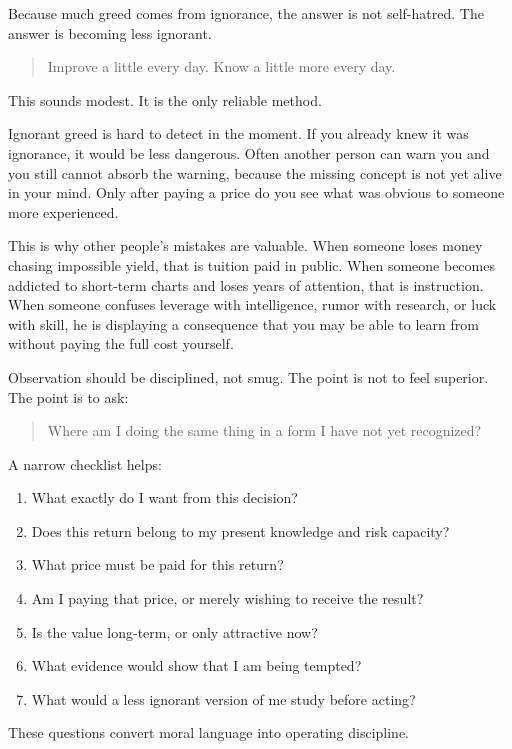 Because much greed comes from ignorance, the answer is not self-hatred. The answer is becoming less ignorant.

\begin{quote}
Improve a little every day. Know a little more every day.
\end{quote}

This sounds modest. It is the only reliable method.

Ignorant greed is hard to detect in the moment. If you already knew it was ignorance, it would be less dangerous. Often another person can warn you and you still cannot absorb the warning, because the missing concept is not yet alive in your mind. Only after paying a price do you see what was obvious to someone more experienced.

This is why other people's mistakes are valuable. When someone loses money chasing impossible yield, that is tuition paid in public. When someone becomes addicted to short-term charts and loses years of attention, that is instruction. When someone confuses leverage with intelligence, rumor with research, or luck with skill, he is displaying a consequence that you may be able to learn from without paying the full cost yourself.

Observation should be disciplined, not smug. The point is not to feel superior. The point is to ask:

\begin{quote}
Where am I doing the same thing in a form I have not yet recognized?
\end{quote}

A narrow checklist helps:

\begin{enumerate}
\item What exactly do I want from this decision?
\item Does this return belong to my present knowledge and risk capacity?
\item What price must be paid for this return?
\item Am I paying that price, or merely wishing to receive the result?
\item Is the value long-term, or only attractive now?
\item What evidence would show that I am being tempted?
\item What would a less ignorant version of me study before acting?
\end{enumerate}

These questions convert moral language into operating discipline.

